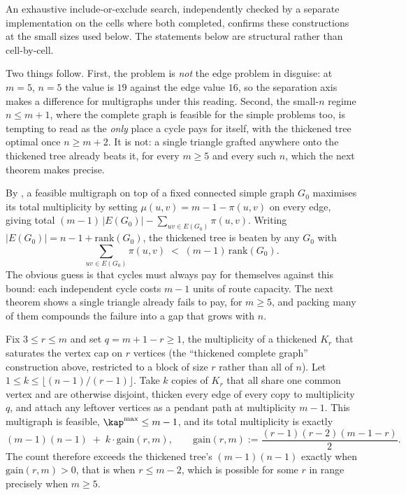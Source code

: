 An exhaustive include-or-exclude search, independently checked by a separate
implementation on the cells where both completed, confirms these constructions
at the small sizes used below. The statements below are structural rather than
cell-by-cell.

Two things follow. First, the problem is \emph{not} the edge problem in disguise: at $m = 5$, $n = 5$ the value is $19$ against the edge value $16$, so the separation axis makes a difference for multigraphs under this reading. Second, the small-$n$ regime $n \le m+1$, where the complete graph is feasible for the simple problems too, is tempting to read as the \emph{only} place a cycle pays for itself, with the thickened tree optimal once $n \ge m+2$. It is not: a single triangle grafted anywhere onto the thickened tree already beats it, for every $m \ge 5$ and every such $n$, which the next theorem makes precise.

By , a feasible multigraph on top of a fixed connected simple graph $G_0$ maximises its total multiplicity by setting $\mu(u,v) = m-1-\pi(u,v)$ on every edge, giving total $(m-1)\,|E(G_0)| - \sum_{uv \in E(G_0)} \pi(u,v)$. Writing $|E(G_0)| = n - 1 + \mathrm{rank}(G_0)$, the thickened tree is beaten by any $G_0$ with
\[
    \sum_{uv \in E(G_0)} \pi(u,v) \;<\; (m-1)\,\mathrm{rank}(G_0).
\]
The obvious guess is that cycles must always pay for themselves against this bound: each independent cycle costs $m-1$ units of route capacity. The next theorem shows a single triangle already fails to pay, for $m \ge 5$, and packing many of them compounds the failure into a gap that grows with $n$.

\begin{theorem}\label{thm:clique-chain-vertex}
Fix $3 \le r \le m$ and set $q = m+1-r \ge 1$, the multiplicity of a thickened $K_r$ that saturates the vertex cap on $r$ vertices (the ``thickened complete graph'' construction above, restricted to a block of size $r$ rather than all of $n$). Let $1 \le k \le \lfloor (n-1)/(r-1) \rfloor$. Take $k$ copies of $K_r$ that all share one common vertex and are otherwise disjoint, thicken every edge of every copy to multiplicity $q$, and attach any leftover vertices as a pendant path at multiplicity $m-1$. This multigraph is feasible, $\kap^{\max} \le m-1$, and its total multiplicity is exactly
\[
    (m-1)(n-1) \;+\; k \cdot \mathrm{gain}(r,m),
    \qquad
    \mathrm{gain}(r,m) := \frac{(r-1)(r-2)(m-1-r)}{2}.
\]
The count therefore exceeds the thickened tree's $(m-1)(n-1)$ exactly when
$\mathrm{gain}(r,m) > 0$, that is when $r \le m-2$, which is possible for some $r$
in range precisely when $m \ge 5$.
\end{theorem}

